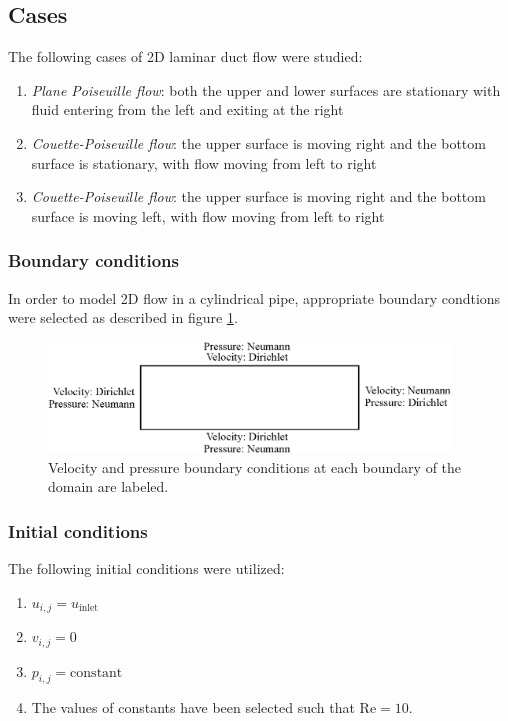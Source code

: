 \documentclass[12pt,a4paper,fleqn]{article}
\begin{document}
\subsection{Cases}
The following cases of 2D laminar duct flow were studied:
\begin{enumerate}
\item \emph{Plane Poiseuille flow}: both the upper and lower surfaces are stationary with fluid entering from the left and exiting at the right
\item \emph{Couette-Poiseuille flow}: the upper surface is moving right and the bottom surface is stationary, with flow moving from left to right
\item \emph{Couette-Poiseuille flow}: the upper surface is moving right and the bottom surface is moving left, with flow moving from left to right
\end{enumerate}

\subsubsection{Boundary conditions}
In order to model 2D flow in a cylindrical pipe, appropriate boundary condtions were selected as described in figure \ref{fig:boundary-conditions}.
\begin{figure}[H]
  \centering
  \includegraphics[width=0.95\textwidth]{boundary_conditions.eps}
  \caption{Velocity and pressure boundary conditions at each boundary of the domain are labeled.}
  \label{fig:boundary-conditions}
\end{figure}

\subsubsection{Initial conditions}
The following initial conditions were utilized:
\begin{enumerate}
\setlength\itemsep{0em}
\item $u_{i,j} = u_\text{inlet}$
\item $v_{i,j} = 0$
\item $p_{i,j} = \text{constant}$
\item The values of constants have been selected such that $\text{Re}= 10$.
\end{enumerate}
\end{document}
